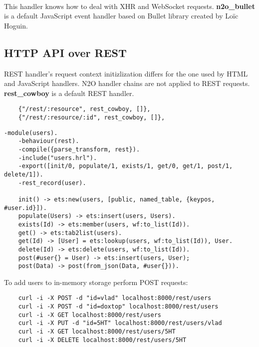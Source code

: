 \paragraph{}
This handler knows how to deal with XHR and WebSocket requests.
{\bf {n2o}\_{bullet}} is a default JavaScript event handler
based on Bullet library created by Loïc Hoguin.

\newpage
\subsection{HTTP API over REST}
REST handler's request context initizlization differs for the one
used by HTML and JavaScript handlers. N2O handler chains are not
applied to REST requests. {\bf rest\_cowboy} is a default REST
handler.

\vspace{1\baselineskip}
\begin{lstlisting}
    {"/rest/:resource", rest_cowboy, []},
    {"/rest/:resource/:id", rest_cowboy, []},
\end{lstlisting}

\lstset{captionpos=b}
\vspace{1\baselineskip}
\begin{lstlisting}[caption=users.erl]
    -module(users).
    -behaviour(rest).
    -compile({parse_transform, rest}).
    -include("users.hrl").
    -export([init/0, populate/1, exists/1, get/0, get/1, post/1, delete/1]).
    -rest_record(user).

    init() -> ets:new(users, [public, named_table, {keypos, #user.id}]).
    populate(Users) -> ets:insert(users, Users).
    exists(Id) -> ets:member(users, wf:to_list(Id)).
    get() -> ets:tab2list(users).
    get(Id) -> [User] = ets:lookup(users, wf:to_list(Id)), User.
    delete(Id) -> ets:delete(users, wf:to_list(Id)).
    post(#user{} = User) -> ets:insert(users, User);
    post(Data) -> post(from_json(Data, #user{})).
\end{lstlisting}
\vspace{1\baselineskip}

To add users to in-memory storage perform POST requests:

\vspace{1\baselineskip}
\begin{lstlisting}
    curl -i -X POST -d "id=vlad" localhost:8000/rest/users
    curl -i -X POST -d "id=doxtop" localhost:8000/rest/users
    curl -i -X GET localhost:8000/rest/users
    curl -i -X PUT -d "id=5HT" localhost:8000/rest/users/vlad
    curl -i -X GET localhost:8000/rest/users/5HT
    curl -i -X DELETE localhost:8000/rest/users/5HT
\end{lstlisting}
\vspace{1\baselineskip}

